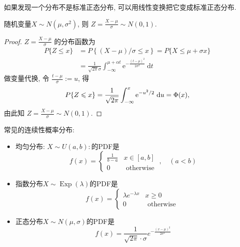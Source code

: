 如果发现一个分布不是标准正态分布, 可以用线性变换把它变成标准正态分布.

\begin{proposition}
    随机变量$X\sim N(\mu,\sigma^2)$, 则 $Z=\frac{X-\mu}{\sigma}\sim N(0,1)$.
\end{proposition}


\begin{proof}
    { $Z=\frac{X-\mu}{\sigma}$ 的分布函数为$$
            \begin{aligned}
                P\{Z \leqslant x\} & =P\left\{{(X-\mu)}/{\sigma} \leqslant x\right\}=P\{X \leqslant \mu+\sigma x\}                                         \\
                                   & =\frac{1}{\sqrt{2 \pi} \sigma} \int_{-\infty}^{\mu+\alpha t} \mathrm{e}^{-\frac{(t-\mu)^2}{2 \sigma^2}} \mathrm{~d} t
            \end{aligned}
        $$
        做变量代换, 令 $\frac{t-\mu}{\sigma}:=u$, 得$$
            \small P\{Z \leqslant x\}=\frac{1}{\sqrt{2 \pi}} \int_{-\infty}^x \mathrm{e}^{-u^2 / 2} \mathrm{~d} u=\Phi(x),
        $$
        由此知 $Z=\frac{X-\mu}{\sigma} \sim N(0,1)$.}
\end{proof}

\begin{takeaway}
    常见的连续性概率分布: 
    \begin{itemize}
        \item 均匀分布: $X\sim U(a, b): $的PDF是$$
        f(x)=\left\{\begin{array}{ll}
        \frac{1}{b-a} & x \in[a, b] \\
        0 & \text { otherwise }
        \end{array}, \quad(a<b)\right.
        $$
        \item 指数分布${X} \sim \operatorname{Exp}(\lambda)$的PDF是$$
        f(x)= \begin{cases}\lambda e^{-\lambda x} & x \geq 0 \\ 0 & \text { otherwise }\end{cases}
        $$
        \item 正态分布$X\sim N(\mu,\sigma)$的PDF是$$
        f(x)=\frac{1}{\sqrt{2 \pi} \cdot \sigma} e^{-\frac{(x-\mu)^2}{2 \sigma^2}}
        $$
    \end{itemize}
\end{takeaway}